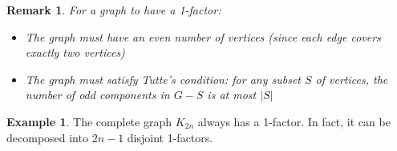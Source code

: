 \documentclass{article}
\newtheorem{remark}{Remark}
\theoremstyle{definition}
\newtheorem{example}{Example}
\begin{document}
\begin{remark}
For a graph to have a 1-factor:
\begin{itemize}
\item The graph must have an even number of vertices (since each edge covers exactly two vertices)
\item The graph must satisfy Tutte's condition: for any subset $S$ of vertices, the number of odd components in $G - S$ is at most $|S|$
\end{itemize}
\end{remark}

\begin{example}
The complete graph $K_{2n}$ always has a 1-factor. In fact, it can be decomposed into $2n-1$ disjoint 1-factors.
\end{example}
\end{document}
